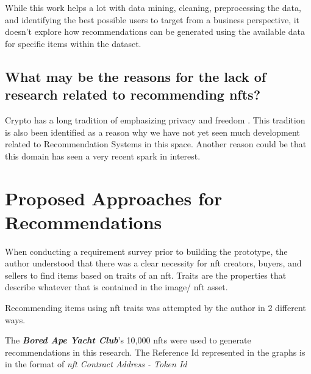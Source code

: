 \documentclass[conference]{IEEEtran}
\begin{document}
While this work helps a lot with data mining, cleaning, preprocessing the data, and identifying the best possible users to target from a business perspective, it doesn't explore how recommendations can be generated using the available data for specific items within the dataset.

\subsection{What may be the reasons for the lack of research related to recommending \gls{nft}s?}


Crypto has a long tradition of emphasizing privacy and freedom \autocite{noauthor_what_2020}. This tradition is also been identified as a reason why we have not yet seen much development related to Recommendation Systems in this space. Another reason could be that this domain has seen a very recent spark in interest.



\section{Proposed Approaches for Recommendations}

When conducting a requirement survey prior to building the prototype, the author understood that there was a clear necessity for \gls{nft} creators, buyers, and sellers to find items based on traits of an \gls{nft}. Traits are the properties that describe whatever that is contained in the image/ \gls{nft} asset.

Recommending items using \gls{nft} traits was attempted by the author in 2 different ways.

The \textbf{\textit{Bored Ape Yacht Club}}'s 10,000 \gls{nft}s were used to generate recommendations in this research. The Reference Id represented in the graphs is in the format of \textit{\gls{nft} Contract Address - Token Id}
\end{document}
